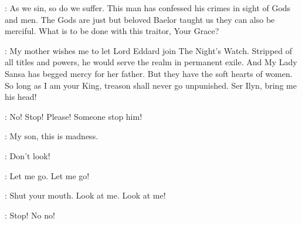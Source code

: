 \PYCELLE: As we sin, so do we suffer. This man has confessed his crimes in sight of Gods and men. The Gods are just but beloved Baelor taught us they can also be merciful.  What is to be done with this traitor, Your Grace? 

\JOFFREY: My mother wishes me to let Lord Eddard join The Night's Watch. Stripped of all titles and powers, he would serve the realm in permanent exile. And My Lady Sansa has begged mercy for her father. But they have the soft hearts of women. So long as I am your King, treason shall never go unpunished. Ser Ilyn, bring me his head! 


\SANSA: No! Stop! Please! Someone stop him! 

\CERSEI: My son, this is madness. 


\YOREN: Don't look! 

\ARYA: Let me go. Let me go! 

\YOREN: Shut your mouth. Look at me. Look at me! 

\SANSA: Stop! No no! 



